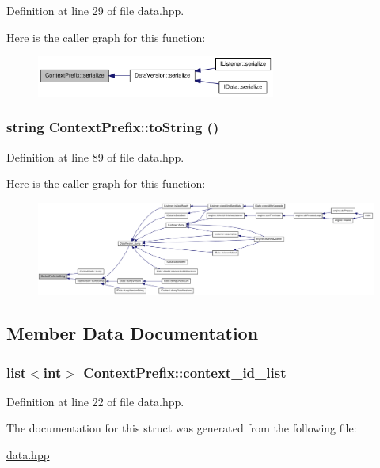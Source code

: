 Definition at line 29 of file data.hpp.

Here is the caller graph for this function:\nopagebreak
\begin{figure}[H]
\begin{center}
\leavevmode
\includegraphics[width=223pt]{struct_context_prefix_a324733817553bbc909f18acd01f697a6_icgraph}
\end{center}
\end{figure}
\hypertarget{struct_context_prefix_ab31c3c3cafc8c6ddf9d755184b7bc678}{
\subsubsection[{toString}]{\setlength{\rightskip}{0pt plus 5cm}string ContextPrefix::toString ()}}
\label{struct_context_prefix_ab31c3c3cafc8c6ddf9d755184b7bc678}


Definition at line 89 of file data.hpp.

Here is the caller graph for this function:\nopagebreak
\begin{figure}[H]
\begin{center}
\leavevmode
\includegraphics[width=420pt]{struct_context_prefix_ab31c3c3cafc8c6ddf9d755184b7bc678_icgraph}
\end{center}
\end{figure}


\subsection{Member Data Documentation}
\hypertarget{struct_context_prefix_a50c0426af5b66766ab87aae8f77a0a31}{
\subsubsection[{context\_\-id\_\-list}]{\setlength{\rightskip}{0pt plus 5cm}list$<$int$>$ {\bf ContextPrefix::context\_\-id\_\-list}}}
\label{struct_context_prefix_a50c0426af5b66766ab87aae8f77a0a31}


Definition at line 22 of file data.hpp.

The documentation for this struct was generated from the following file:\begin{DoxyCompactItemize}
\item 
\hyperlink{data_8hpp}{data.hpp}\end{DoxyCompactItemize}
